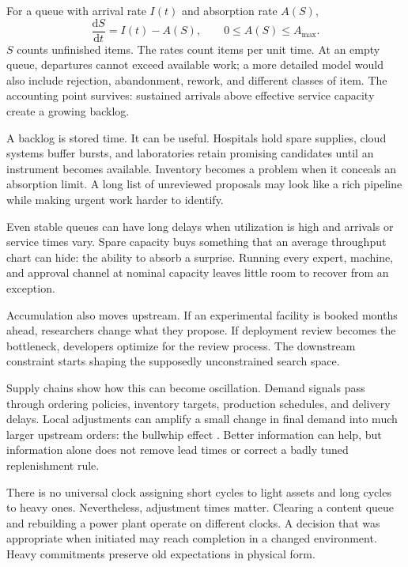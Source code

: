 \documentclass[11pt,openany]{book}
\begin{document}
For a queue with arrival rate $I(t)$ and absorption rate $A(S)$,
\begin{equation}
 \frac{\mathrm{d}S}{\mathrm{d}t}=I(t)-A(S),
 \qquad 0\leq A(S)\leq A_{\max}.
\end{equation}
$S$ counts unfinished items. The rates count items per unit time. At an empty queue, departures cannot exceed available work; a more detailed model would also include rejection, abandonment, rework, and different classes of item. The accounting point survives: sustained arrivals above effective service capacity create a growing backlog.

A backlog is stored time. It can be useful. Hospitals hold spare supplies, cloud systems buffer bursts, and laboratories retain promising candidates until an instrument becomes available. Inventory becomes a problem when it conceals an absorption limit. A long list of unreviewed proposals may look like a rich pipeline while making urgent work harder to identify.

Even stable queues can have long delays when utilization is high and arrivals or service times vary. Spare capacity buys something that an average throughput chart can hide: the ability to absorb a surprise. Running every expert, machine, and approval channel at nominal capacity leaves little room to recover from an exception.

Accumulation also moves upstream. If an experimental facility is booked months ahead, researchers change what they propose. If deployment review becomes the bottleneck, developers optimize for the review process. The downstream constraint starts shaping the supposedly unconstrained search space.

Supply chains show how this can become oscillation. Demand signals pass through ordering policies, inventory targets, production schedules, and delivery delays. Local adjustments can amplify a small change in final demand into much larger upstream orders: the bullwhip effect \cite{lee1997information}. Better information can help, but information alone does not remove lead times or correct a badly tuned replenishment rule.

There is no universal clock assigning short cycles to light assets and long cycles to heavy ones. Nevertheless, adjustment times matter. Clearing a content queue and rebuilding a power plant operate on different clocks. A decision that was appropriate when initiated may reach completion in a changed environment. Heavy commitments preserve old expectations in physical form.
\end{document}
